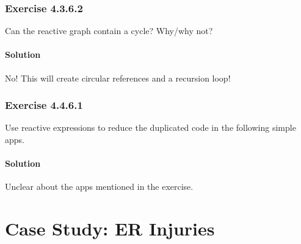 \documentclass[]{book}
\begin{document}
\hypertarget{exercise-4.3.6.2}{%
\subsection*{Exercise 4.3.6.2}\label{exercise-4.3.6.2}}

Can the reactive graph contain a cycle? Why/why not?

\begin{solution}

\hypertarget{solution-1}{%
\subsubsection*{Solution}\label{solution-1}}

No! This will create circular references and a recursion loop!

\end{solution}

\hypertarget{exercise-4.4.6.1}{%
\subsection*{Exercise 4.4.6.1}\label{exercise-4.4.6.1}}

Use reactive expressions to reduce the duplicated code in the following simple
apps.

\begin{solution}

\hypertarget{solution-2}{%
\subsubsection*{Solution}\label{solution-2}}

\begin{note}

Unclear about the apps mentioned in the exercise.

\end{note}

\end{solution}

\hypertarget{case-study-er-injuries}{%
\chapter{Case Study: ER Injuries}\label{case-study-er-injuries}}
\end{document}
